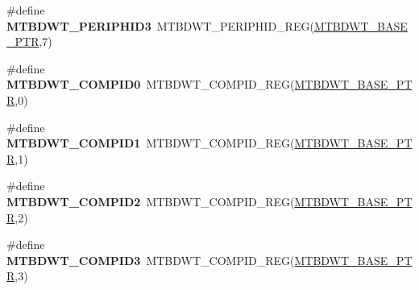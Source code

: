 \begin{DoxyCompactItemize}
\item 
\hypertarget{group___m_t_b_d_w_t___register___accessor___macros_ga6496ee3e7267206af1ef1f6118c0bbcf}{}\#define {\bfseries M\+T\+B\+D\+W\+T\+\_\+\+P\+E\+R\+I\+P\+H\+I\+D3}~M\+T\+B\+D\+W\+T\+\_\+\+P\+E\+R\+I\+P\+H\+I\+D\+\_\+\+R\+E\+G(\hyperlink{group___m_t_b_d_w_t___peripheral_ga97d048bfb5a11293a38c444b8347ff42}{M\+T\+B\+D\+W\+T\+\_\+\+B\+A\+S\+E\+\_\+\+P\+T\+R},7)\label{group___m_t_b_d_w_t___register___accessor___macros_ga6496ee3e7267206af1ef1f6118c0bbcf}

\item 
\hypertarget{group___m_t_b_d_w_t___register___accessor___macros_gabea41b046757f76e965573ba1205b5b2}{}\#define {\bfseries M\+T\+B\+D\+W\+T\+\_\+\+C\+O\+M\+P\+I\+D0}~M\+T\+B\+D\+W\+T\+\_\+\+C\+O\+M\+P\+I\+D\+\_\+\+R\+E\+G(\hyperlink{group___m_t_b_d_w_t___peripheral_ga97d048bfb5a11293a38c444b8347ff42}{M\+T\+B\+D\+W\+T\+\_\+\+B\+A\+S\+E\+\_\+\+P\+T\+R},0)\label{group___m_t_b_d_w_t___register___accessor___macros_gabea41b046757f76e965573ba1205b5b2}

\item 
\hypertarget{group___m_t_b_d_w_t___register___accessor___macros_gad1e9f6c3c5eeeeab187787e6eff15d4e}{}\#define {\bfseries M\+T\+B\+D\+W\+T\+\_\+\+C\+O\+M\+P\+I\+D1}~M\+T\+B\+D\+W\+T\+\_\+\+C\+O\+M\+P\+I\+D\+\_\+\+R\+E\+G(\hyperlink{group___m_t_b_d_w_t___peripheral_ga97d048bfb5a11293a38c444b8347ff42}{M\+T\+B\+D\+W\+T\+\_\+\+B\+A\+S\+E\+\_\+\+P\+T\+R},1)\label{group___m_t_b_d_w_t___register___accessor___macros_gad1e9f6c3c5eeeeab187787e6eff15d4e}

\item 
\hypertarget{group___m_t_b_d_w_t___register___accessor___macros_gade8bf5b51854635778d28fbb31174a12}{}\#define {\bfseries M\+T\+B\+D\+W\+T\+\_\+\+C\+O\+M\+P\+I\+D2}~M\+T\+B\+D\+W\+T\+\_\+\+C\+O\+M\+P\+I\+D\+\_\+\+R\+E\+G(\hyperlink{group___m_t_b_d_w_t___peripheral_ga97d048bfb5a11293a38c444b8347ff42}{M\+T\+B\+D\+W\+T\+\_\+\+B\+A\+S\+E\+\_\+\+P\+T\+R},2)\label{group___m_t_b_d_w_t___register___accessor___macros_gade8bf5b51854635778d28fbb31174a12}

\item 
\hypertarget{group___m_t_b_d_w_t___register___accessor___macros_ga3a9bd5acf838d38819681843c6fea66f}{}\#define {\bfseries M\+T\+B\+D\+W\+T\+\_\+\+C\+O\+M\+P\+I\+D3}~M\+T\+B\+D\+W\+T\+\_\+\+C\+O\+M\+P\+I\+D\+\_\+\+R\+E\+G(\hyperlink{group___m_t_b_d_w_t___peripheral_ga97d048bfb5a11293a38c444b8347ff42}{M\+T\+B\+D\+W\+T\+\_\+\+B\+A\+S\+E\+\_\+\+P\+T\+R},3)\label{group___m_t_b_d_w_t___register___accessor___macros_ga3a9bd5acf838d38819681843c6fea66f}


\end{DoxyCompactItemize}
